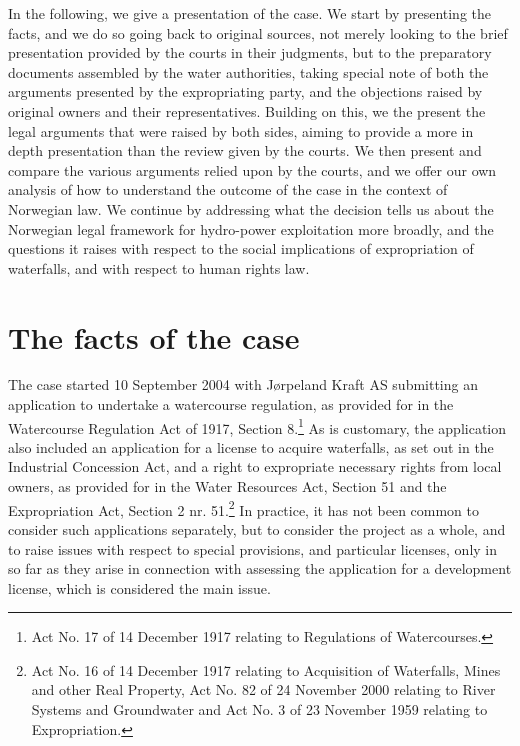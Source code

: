 In the following, we give a presentation of the case. We start by presenting the facts, and we do so going back to original sources, not merely looking to the brief presentation provided by the courts in their judgments, but to the preparatory documents assembled by the water authorities, taking special note of both the arguments presented by the expropriating party, and the objections raised by original owners and their representatives. Building on this, we the present the legal arguments that were raised by both sides, aiming to provide a more in depth presentation than the review given by the courts. We then present and compare the various arguments relied upon by the courts, and we offer our own analysis of how to understand the outcome of the case in the context of Norwegian law. We continue by addressing what the decision tells us about the Norwegian legal framework for hydro-power exploitation more broadly, and the questions it raises with respect to the social implications of expropriation of waterfalls, and with respect to human rights law.

\section{The facts of the case}\label{sum}

The case started 10 September 2004 with Jørpeland Kraft AS submitting an application to undertake a watercourse regulation, as provided for in the Watercourse Regulation Act of 1917, Section 8.\footnote{Act No. 17 of 14 December 1917 relating to Regulations of Watercourses.} As is customary, the application also included an application for a license to acquire waterfalls, as set out in the Industrial Concession Act, and a right to expropriate necessary rights from local owners, as provided for in the Water Resources Act, Section 51 and the Expropriation Act, Section 2 nr. 51.\footnote{Act No. 16 of 14 December 1917 relating to Acquisition of Waterfalls, Mines and other Real Property, Act No. 82 of 24 November 2000 relating to River Systems and Groundwater and Act No. 3 of 23 November 1959 relating to Expropriation.} In practice, it has not been common to consider such applications separately, but to consider the project as a whole, and to raise issues with respect to special provisions, and particular licenses, only in so far as they arise in connection with assessing the application for a development license, which is considered the main issue.

